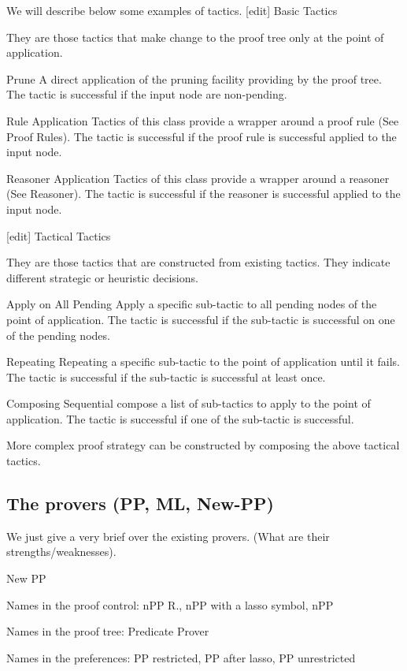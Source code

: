 We will describe below some examples of tactics.
[edit] Basic Tactics

They are those tactics that make change to the proof tree only at the point of application.

    Prune A direct application of the pruning facility providing by the proof tree. The tactic is successful if the input node are non-pending. 

    Rule Application Tactics of this class provide a wrapper around a proof rule (See Proof Rules). The tactic is successful if the proof rule is successful applied to the input node. 

    Reasoner Application Tactics of this class provide a wrapper around a reasoner (See Reasoner). The tactic is successful if the reasoner is successful applied to the input node. 

[edit] Tactical Tactics

They are those tactics that are constructed from existing tactics. They indicate different strategic or heuristic decisions.

    Apply on All Pending Apply a specific sub-tactic to all pending nodes of the point of application. The tactic is successful if the sub-tactic is successful on one of the pending nodes. 

    Repeating Repeating a specific sub-tactic to the point of application until it fails. The tactic is successful if the sub-tactic is successful at least once. 

    Composing Sequential compose a list of sub-tactics to apply to the point of application. The tactic is successful if one of the sub-tactic is successful. 

More complex proof strategy can be constructed by composing the above tactical tactics. 

\subsection{The provers (PP, ML, New-PP)}


We just give a very brief over the existing provers. (What are their strengths/weaknesses).

New PP

Names in the proof control: nPP R., nPP with a lasso symbol, nPP

Names in the proof tree: Predicate Prover

Names in the preferences: PP restricted, PP after lasso, PP unrestricted

